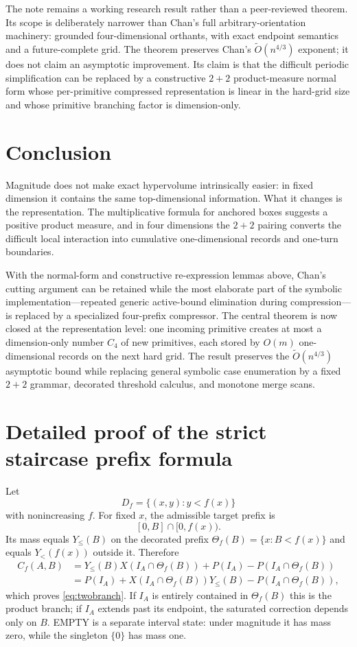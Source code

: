 \documentclass[12pt,a4paper]{article}
\theoremstyle{definition}
\newcommand{\1}{\mathbf 1}
\newcommand{\wtO}{\widetilde O}
\begin{document}
The note remains a working research result rather than a peer-reviewed theorem.  Its scope is deliberately narrower than Chan's full arbitrary-orientation machinery: grounded four-dimensional orthants, with exact endpoint semantics and a future-complete grid.  The theorem preserves Chan's $\widetilde O(n^{4/3})$ exponent; it does not claim an asymptotic improvement.  Its claim is that the difficult periodic simplification can be replaced by a constructive $2+2$ product-measure normal form whose per-primitive compressed representation is linear in the hard-grid size and whose primitive branching factor is dimension-only.

\section{Conclusion}

Magnitude does not make exact hypervolume intrinsically easier: in fixed dimension it contains the same top-dimensional information. What it changes is the representation. The multiplicative formula for anchored boxes suggests a positive product measure, and in four dimensions the $2+2$ pairing converts the difficult local interaction into cumulative one-dimensional records and one-turn boundaries.

With the normal-form and constructive re-expression lemmas above, Chan's cutting argument can be retained while the most elaborate part of the symbolic implementation---repeated generic active-bound elimination during compression---is replaced by a specialized four-prefix compressor.  The central theorem is now closed at the representation level: one incoming primitive creates at most a dimension-only number $C_4$ of new primitives, each stored by $O(m)$ one-dimensional records on the next hard grid.  The result preserves the $\wtO(n^{4/3})$ asymptotic bound while replacing general symbolic case enumeration by a fixed $2+2$ grammar, decorated threshold calculus, and monotone merge scans.

\appendix

\section{Detailed proof of the strict staircase prefix formula}       \label{app:twobranch}

Let
\[
D_f=\{(x,y):y<f(x)\}
\]
with nonincreasing $f$.  For fixed $x$, the admissible target prefix is
\[
[0,B]\cap[0,f(x)).
\]
Its mass equals $Y_{\le}(B)$ on the decorated prefix $\Theta_f(B)=\{x:B<f(x)\}$ and equals $Y_{<}(f(x))$ outside it.  Therefore
\[
\begin{aligned}
C_f(A,B)
&=Y_{\le}(B)X(I_A\cap\Theta_f(B))
  +P(I_A)-P(I_A\cap\Theta_f(B))\\
&=P(I_A)+X(I_A\cap\Theta_f(B))Y_{\le}(B)
  -P(I_A\cap\Theta_f(B)),
\end{aligned}
\]
which proves \eqref{eq:twobranch}.  If $I_A$ is entirely contained in $\Theta_f(B)$ this is the product branch; if $I_A$ extends past its endpoint, the saturated correction depends only on $B$.  EMPTY is a separate interval state: under magnitude it has mass zero, while the singleton $\{0\}$ has mass one.
\end{document}
